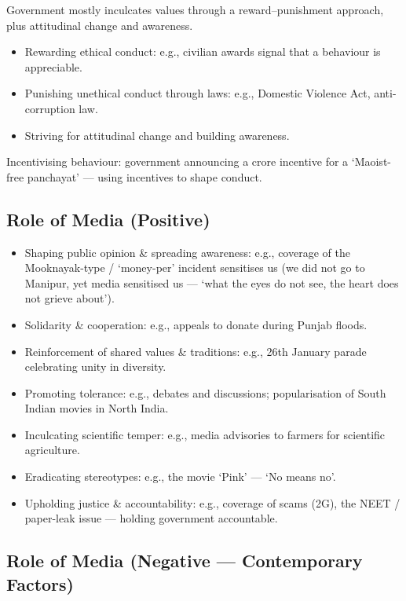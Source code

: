 Government mostly inculcates values through a reward--punishment approach, plus attitudinal change and awareness.

\begin{itemize}
\item Rewarding ethical conduct: e.g., civilian awards signal that a behaviour is appreciable.
\item Punishing unethical conduct through laws: e.g., Domestic Violence Act, anti-corruption law.
\item Striving for attitudinal change and building awareness.
\end{itemize}

\begin{GovtPolicy}
Incentivising behaviour: government announcing a  crore incentive for a `Maoist-free panchayat' --- using incentives to shape conduct.
\end{GovtPolicy}

\subsection{Role of Media (Positive)}

\begin{itemize}
\item Shaping public opinion \& spreading awareness: e.g., coverage of the Mooknayak-type / `money-per' incident sensitises us (we did not go to Manipur, yet media sensitised us --- `what the eyes do not see, the heart does not grieve about').
\item Solidarity \& cooperation: e.g., appeals to donate during Punjab floods.
\item Reinforcement of shared values \& traditions: e.g., 26th January parade celebrating unity in diversity.
\item Promoting tolerance: e.g., debates and discussions; popularisation of South Indian movies in North India.
\item Inculcating scientific temper: e.g., media advisories to farmers for scientific agriculture.
\item Eradicating stereotypes: e.g., the movie `Pink' --- `No means no'.
\item Upholding justice \& accountability: e.g., coverage of scams (2G), the NEET / paper-leak issue --- holding government accountable.
\end{itemize}

\subsection{Role of Media (Negative --- Contemporary Factors)}


